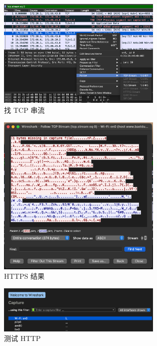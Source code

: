 \begin{figure}[htb]
\centering 
\includegraphics[width=0.70\textwidth]{img/ch1s4m4.png} 
\caption{找 TCP 串流}
\label{Test}
\end{figure}

\begin{figure}[htb]
\centering 
\includegraphics[width=0.70\textwidth]{img/ch1s4m5.png} 
\caption{HTTPS 结果}
\label{Test}
\end{figure}

\begin{figure}[htb]
\centering 
\includegraphics[width=0.70\textwidth]{img/ch1s4m6.png} 
\caption{测试 HTTP}
\label{Test}
\end{figure}


